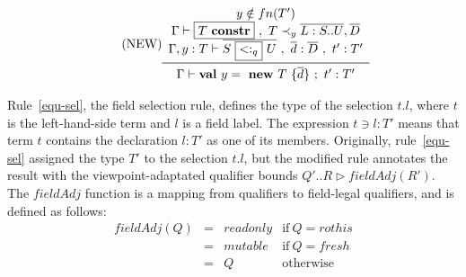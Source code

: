 \begin{equation*}\tag{NEW}\label{equ-new}
\begin{array}{c}
y \notin fn(T') \\
\Gamma \vdash \boxed{T\ {\bf constr}}\ ,\ T \prec_y \overline{L : S .. U},\overline{D} \\
\Gamma, y : T \vdash \overline{S\ \boxed{<:_q}\ U}\ ,\ \overline{d} : \overline{D}\ ,\ t' : T' \\
\midrule
\Gamma \vdash {\bf val}\ y =\ {\bf new}\ T\ \{\overline{d}\}\ ;\ t' : T' \\
\end{array}
\end{equation*}

\vspace{0.4cm}

Rule~\ref{equ-sel}, the field selection rule,
defines the type of the selection \mbox{$t.l$}, where $t$ is the left-hand-side term
and $l$ is a field label. The expression \mbox{$t \ni l : T'$}
means that term $t$ contains the declaration \mbox{$l : T'$} as one of its members.
Originally, rule~\ref{equ-sel} assigned the type $T'$ to the selection \mbox{$t.l$},
but the modified rule annotates the result with the viewpoint-adaptated qualifier bounds
\mbox{$Q'..R \triangleright fieldAdj(R')$}.
The $fieldAdj$ function is a mapping from qualifiers to field-legal qualifiers,
and is defined as follows:
\begin{equation*}\tag{FIELDADJ}\label{equ-fieldadj}
\begin{array}{lcll}
	fieldAdj(Q) &=& readonly & \text{if}\ Q = rothis \\
	            &=& mutable & \text{if}\ Q = fresh \\
							&=& Q & \text{otherwise} \\
\end{array}
\end{equation*}

